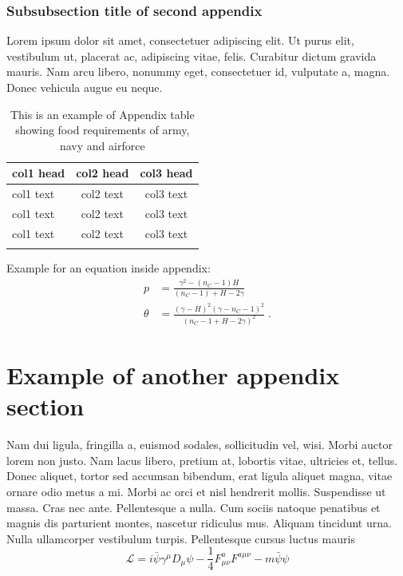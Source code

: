 \documentclass[numbers,webpdf]{ima-authoring-template}%
\theoremstyle{thmstyletwo}%
\numberwithin{equation}{section}
\begin{document}
\subsubsection{Subsubsection title of second appendix}\label{subsubsec4}

Lorem ipsum dolor sit amet, consectetuer adipiscing elit. Ut purus elit, vestibulum ut, placerat ac, adipiscing vitae,
felis. Curabitur dictum gravida mauris. Nam arcu libero, nonummy eget, consectetuer id, vulputate a, magna. Donec
vehicula augue eu neque.

\begin{table}[t]%
\caption{This is an example of Appendix table showing food requirements of army, navy and airforce\label{tab4}}%
\begin{tabular*}{\textwidth}{@{\extracolsep\fill}lcc@{}}%
\toprule
col1 head & col2 head & col3 head \\
\midrule
col1 text & col2 text & col3 text \\
col1 text & col2 text & col3 text \\
col1 text & col2 text & col3 text \\
\botrule
\end{tabular*}
\end{table}

Example for an equation inside appendix:
\begin{align}
 p &= \frac{\gamma^{2} - (n_{C} -1)H}{(n_{C} - 1) + H - 2\gamma} \label{1eq:hybobo:pfromgH} \\
 \theta &= \frac{(\gamma - H)^{2}(\gamma - n_{C} -1)^{2}}{(n_{C} - 1 + H - 2\gamma)^{2}} \label{2eq:hybobo:tfromgH}\; .
\end{align}

\section{Example of another appendix section}\label{sec13}%

Nam dui ligula, fringilla a, euismod sodales, sollicitudin vel, wisi. Morbi auctor lorem non justo. Nam lacus libero,
pretium at, lobortis vitae, ultricies et, tellus. Donec aliquet, tortor sed accumsan bibendum, erat ligula aliquet magna,
vitae ornare odio metus a mi. Morbi ac orci et nisl hendrerit mollis. Suspendisse ut massa. Cras nec ante. Pellentesque
a nulla. Cum sociis natoque penatibus et magnis dis parturient montes, nascetur ridiculus mus. Aliquam tincidunt
urna. Nulla ullamcorper vestibulum turpis. Pellentesque cursus luctus mauris
\begin{equation}
\mathcal{L} = i \bar{\psi} \gamma^\mu D_\mu \psi
    - \frac{1}{4} F_{\mu\nu}^a F^{a\mu\nu} - m \bar{\psi} \psi
\label{eq26}
\end{equation}
\end{document}
